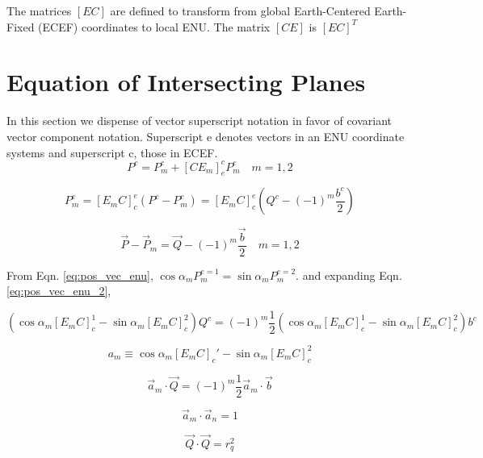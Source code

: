 \documentclass[12pt]{article}
\begin{document}
	The matrices $[EC]$ are defined to transform from global Earth-Centered Earth-Fixed (ECEF) coordinates to local
	ENU. The matrix $[CE]$ is $[EC]^T$
	
	\section{Equation of Intersecting Planes}
	In this section we dispense of vector superscript notation in favor of covariant vector component notation. Superscript e denotes vectors in an ENU coordinate systems and superscript c, those in ECEF.
	\begin{equation}
	P^c = P_m^c + \left[ C E_m \right]_e^c P_m^e  \quad m = 1, 2
	\end{equation}
	
	\begin{equation}
	P_m^e = \left[ E_m C \right]_c^e \left( P^c - P_m^c \right) = \left[ E_m C \right]_c^e \left( Q^c - (-1)^m \frac{b^c}{2} \right)
	\label{eq:pos_vec_enu_2}
	\end{equation}
	
	\begin{equation}
	\vec{P} - \vec{P}_m = \vec{Q} - (-1)^m \frac{\vec{b}}{2} \quad m = 1, 2
	\end{equation}
	
	From Eqn. \ref{eq:pos_vec_enu},
	$
	\cos\alpha_m P_m^{e=1} = \sin\alpha_m P_m^{e=2}.
	$
	and expanding Eqn. \ref{eq:pos_vec_enu_2},
	
	\begin{equation}
		\left( \cos\alpha_m \left[ E_m C \right]_c^1 - \sin\alpha_m \left[ E_m C \right]_c^2 \right) Q^c = 
		 (-1)^{m} \frac{1}{2} \left( \cos\alpha_m \left[ E_m C \right]_c^1 - \sin\alpha_m \left[ E_m C \right]_c^2 \right) b^c
	\end{equation}
	
	\begin{equation}
	a_m \equiv \cos \alpha_m \left[ E_m C \right]_c' - \sin \alpha_m \left[ E_m C \right]_c^2
	\end{equation}
	
	\begin{equation}
	\vec{a}_m \cdot \vec{Q} = (-1)^m \frac{1}{2} \vec{a}_m \cdot \vec{b}
	\end{equation}
	
	\begin{equation}
	\vec{a}_m \cdot \vec{a}_n = 1
	\end{equation}
	
	\begin{equation}
	\vec{Q} \cdot \vec{Q} = r_q^2
	\end{equation}
	
\end{document}
